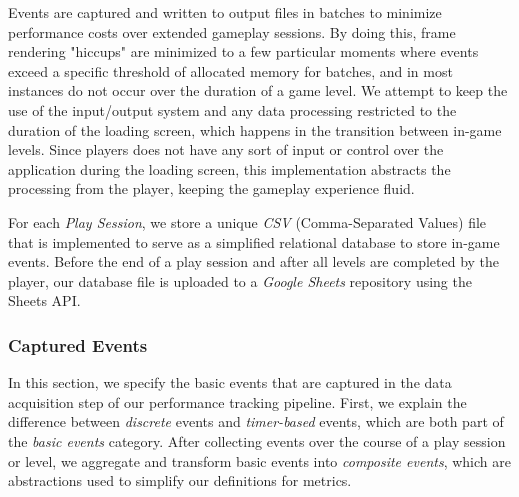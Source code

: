 

Events are captured and written to output files in batches to minimize performance costs over extended gameplay sessions. By doing this, frame rendering "hiccups" are minimized to a few particular moments where events exceed a specific threshold of allocated memory for batches, and in most instances do not occur over the duration of a game level. We attempt to keep the use of the input/output system and any data processing restricted to the duration of the loading screen, which happens in the transition between in-game levels. Since players does not have any sort of input or control over the application during the loading screen, this implementation abstracts the processing from the player, keeping the gameplay experience fluid.


For each \emph{Play Session}, we store a unique \emph{CSV} (Comma-Separated Values) file that is implemented to serve as a simplified relational database to store in-game events. Before the end of a play session and after all levels are completed by the player, our database file is uploaded to a \emph{Google Sheets} repository using the Sheets API.

\subsubsection{Captured Events}

In this section, we specify the basic events that are captured in the data acquisition step of our performance tracking pipeline. First, we explain the difference between \emph{discrete} events and \emph{timer-based} events, which are both part of the \emph{basic events} category. After collecting events over the course of a play session or level, we aggregate and transform basic events into \emph{composite events}, which are abstractions used to simplify our definitions for metrics.


